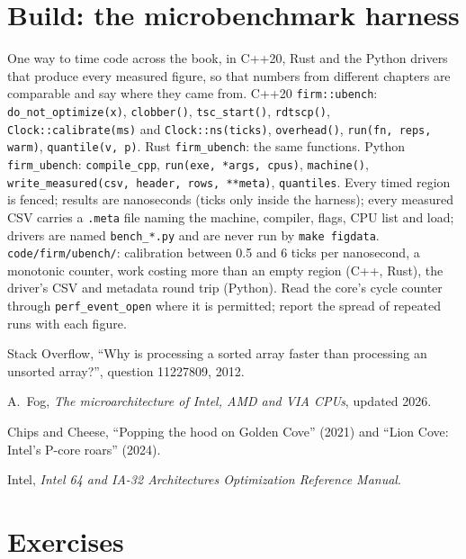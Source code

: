 \section{Build: the microbenchmark harness}\label{bld:ll:cpu-microarchitecture:ubench}

\begin{build}
 One way to time code across the book, in C++20, Rust and the Python drivers that produce every
measured figure, so that numbers from different chapters are comparable and say where they came from.
 C++20 \texttt{firm::ubench}: \texttt{do\_not\_optimize(x)}, \texttt{clobber()},
\texttt{tsc\_start()}, \texttt{rdtscp()}, \texttt{Clock::calibrate(ms)} and \texttt{Clock::ns(ticks)},
\texttt{overhead()}, \texttt{run(fn, reps, warm)}, \texttt{quantile(v, p)}. Rust \texttt{firm\_ubench}: the same
functions. Python \texttt{firm\_ubench}: \texttt{compile\_cpp}, \texttt{run(exe, *args, cpus)},
\texttt{machine()}, \texttt{write\_measured(csv, header, rows, **meta)}, \texttt{quantiles}.
 Every timed region is fenced; results are nanoseconds (ticks only inside the harness); every measured CSV
carries a \texttt{.meta} file naming the machine, compiler, flags, CPU list and load; drivers are named
\texttt{bench\_*.py} and are never run by \texttt{make figdata}.
 \texttt{code/firm/ubench/}: calibration between 0.5 and 6 ticks per nanosecond, a monotonic
counter, work costing more than an empty region (C++, Rust), the driver's CSV and metadata round trip (Python).
 Read the core's cycle counter through \texttt{perf\_event\_open} where it is permitted; report the
spread of repeated runs with each figure.
\end{build}

\begin{omsources}
\item Stack Overflow, ``Why is processing a sorted array faster than processing an unsorted array?'', question
11227809, 2012.
\item A.~Fog, \emph{The microarchitecture of Intel, AMD and VIA CPUs}, updated 2026.
\item Chips and Cheese, ``Popping the hood on Golden Cove'' (2021) and ``Lion Cove: Intel's P-core roars'' (2024).
\item Intel, \emph{Intel 64 and IA-32 Architectures Optimization Reference Manual}.
\end{omsources}

\section{Exercises}

